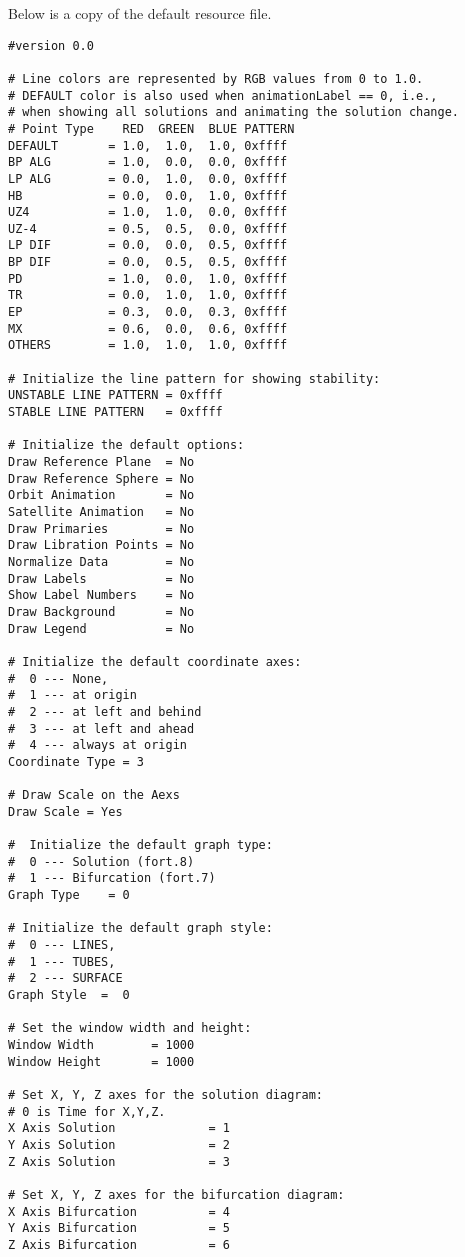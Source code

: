 Below is a copy of the default resource file.
{\footnotesize
\begin{verbatim}
#version 0.0

# Line colors are represented by RGB values from 0 to 1.0.
# DEFAULT color is also used when animationLabel == 0, i.e.,
# when showing all solutions and animating the solution change.
# Point Type    RED  GREEN  BLUE PATTERN
DEFAULT       = 1.0,  1.0,  1.0, 0xffff
BP ALG        = 1.0,  0.0,  0.0, 0xffff
LP ALG        = 0.0,  1.0,  0.0, 0xffff
HB            = 0.0,  0.0,  1.0, 0xffff
UZ4           = 1.0,  1.0,  0.0, 0xffff
UZ-4          = 0.5,  0.5,  0.0, 0xffff
LP DIF        = 0.0,  0.0,  0.5, 0xffff
BP DIF        = 0.0,  0.5,  0.5, 0xffff
PD            = 1.0,  0.0,  1.0, 0xffff
TR            = 0.0,  1.0,  1.0, 0xffff
EP            = 0.3,  0.0,  0.3, 0xffff
MX            = 0.6,  0.0,  0.6, 0xffff
OTHERS        = 1.0,  1.0,  1.0, 0xffff

# Initialize the line pattern for showing stability:
UNSTABLE LINE PATTERN = 0xffff
STABLE LINE PATTERN   = 0xffff

# Initialize the default options:
Draw Reference Plane  = No
Draw Reference Sphere = No
Orbit Animation       = No
Satellite Animation   = No
Draw Primaries        = No
Draw Libration Points = No
Normalize Data        = No
Draw Labels           = No
Show Label Numbers    = No
Draw Background       = No
Draw Legend           = No

# Initialize the default coordinate axes:
#  0 --- None,
#  1 --- at origin
#  2 --- at left and behind
#  3 --- at left and ahead
#  4 --- always at origin
Coordinate Type = 3

# Draw Scale on the Aexs
Draw Scale = Yes

#  Initialize the default graph type:
#  0 --- Solution (fort.8)
#  1 --- Bifurcation (fort.7)
Graph Type    = 0

# Initialize the default graph style:
#  0 --- LINES,
#  1 --- TUBES,
#  2 --- SURFACE
Graph Style  =  0

# Set the window width and height:
Window Width        = 1000
Window Height       = 1000

# Set X, Y, Z axes for the solution diagram:
# 0 is Time for X,Y,Z.
X Axis Solution             = 1
Y Axis Solution             = 2
Z Axis Solution             = 3

# Set X, Y, Z axes for the bifurcation diagram:
X Axis Bifurcation          = 4
Y Axis Bifurcation          = 5
Z Axis Bifurcation          = 6


\end{verbatim}}
